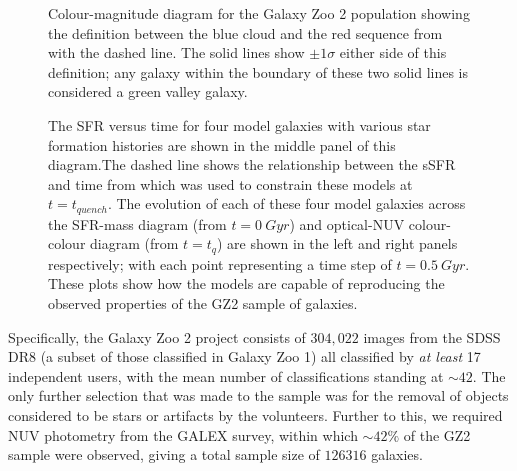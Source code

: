 \documentclass{mn2e}
\begin{document}
\begin{figure}
\caption{Colour-magnitude diagram for the Galaxy Zoo 2 population showing the definition between the blue cloud and the red sequence from \citet{Baldry} with the dashed line. The solid lines show $\pm 1\sigma$ either side of this definition; any galaxy within the boundary of these two solid lines is considered a green valley galaxy.}
\label{CMGV}
\end{figure}

\begin{figure}
\caption{The SFR versus time for four model galaxies with various star formation histories are shown in the middle panel of this diagram.The dashed line shows the relationship between the sSFR and time from \citet{Peng} which was used to constrain these models at $t=t_{quench}$. The evolution of each of these four model galaxies across the SFR-mass diagram (from $t=0~Gyr$) and optical-NUV colour-colour diagram (from $t=t_q$) are shown in the left and right panels respectively; with each point representing a time step of $t=0.5~Gyr$. These plots show how the models are capable of reproducing the observed properties of the GZ2 sample of galaxies.}
\label{sfr_mass_col}
\end{figure}

Specifically, the Galaxy Zoo 2 project consists of $304, 022$ images from the SDSS DR8 (a subset of those classified in Galaxy Zoo 1) all classified by \emph{at least} 17 independent users, with the mean number of classifications standing at $\sim42$. The only further selection that was made to the sample was for the removal of  objects considered to be stars or artifacts by the volunteers. Further to this, we required NUV photometry from the GALEX survey, within which $\sim42\%$ of the GZ2 sample were observed, giving a total sample size of $126316$ galaxies. 
\end{document}

